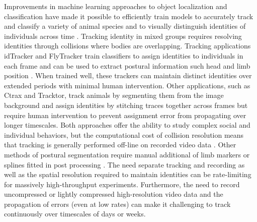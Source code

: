 \documentclass[10pt]{article}
\begin{document}
\begin{multicols}{2}
Improvements in machine learning approaches to object localization and classification have made it possible to efficiently train models to accurately track and classify a variety of animal species and to visually distinguish identities of individuals across time \cite{Eyjolfsdottir_Detecting_2014,Prez-Escudero_idTracker_2014}. Tracking identity in mixed groups requires resolving identities through collisions where bodies are overlapping. Tracking applications idTracker and FlyTracker train classifiers to assign identities to individuals in each frame and can be used to extract postural information such head and limb position \cite{Eyjolfsdottir_Detecting_2014}. When trained well, these trackers can maintain distinct identities over extended periods with minimal human intervention. Other applications, such as Ctrax and Tracktor\cite{Branson_High_2009,Rodriguez_ToxId_2017,Sridhar_Tracktor_2018}, track animals by segmenting them from the image background and assign identities by stitching traces together across frames but require human intervention to prevent assignment error from propagating over longer timescales. Both approaches offer the ability to study complex social and individual behaviors, but the computational cost of collision resolution means that tracking is generally performed off-line on recorded video data \cite{Liu_A_2018}. Other methods of postural segmentation require manual additional of limb markers or splines fitted in post processing \cite{Kain_Leg_2013,Uhlmann_FlyLimbTracker_2017}. The need separate tracking and recording as well as the spatial resolution required to maintain identities can be rate-limiting for massively high-throughput experiments. Furthermore, the need to record uncompressed or lightly compressed high-resolution video data and the propagation of errors (even at low rates) can make it challenging to track continuously over timescales of days or weeks.


\end{multicols}
\end{document}
